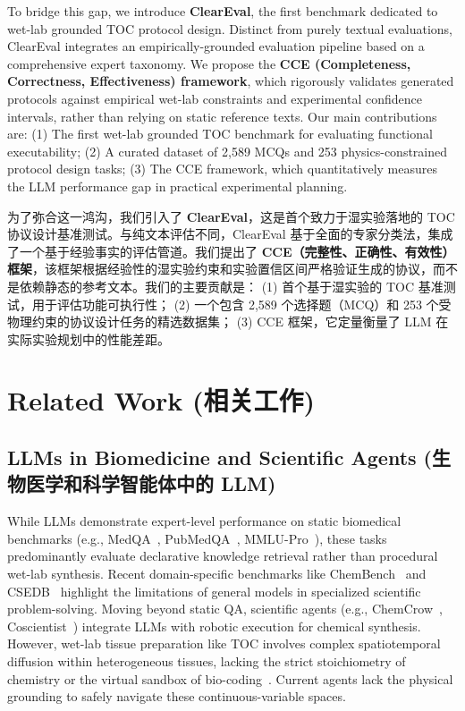\documentclass[runningheads]{llncs}
\begin{document}
To bridge this gap, we introduce \textbf{ClearEval}, the first benchmark dedicated to wet-lab grounded TOC protocol design. Distinct from purely textual evaluations, ClearEval integrates an empirically-grounded evaluation pipeline based on a comprehensive expert taxonomy. We propose the \textbf{CCE (Completeness, Correctness, Effectiveness) framework}, which rigorously validates generated protocols against empirical wet-lab constraints and experimental confidence intervals, rather than relying on static reference texts. Our main contributions are: 
(1) The first wet-lab grounded TOC benchmark for evaluating functional executability; 
(2) A curated dataset of 2,589 MCQs and 253 physics-constrained protocol design tasks; 
(3) The CCE framework, which quantitatively measures the LLM performance gap in practical experimental planning.

为了弥合这一鸿沟，我们引入了 \textbf{ClearEval}，这是首个致力于湿实验落地的 TOC 协议设计基准测试。与纯文本评估不同，ClearEval 基于全面的专家分类法，集成了一个基于经验事实的评估管道。我们提出了 \textbf{CCE（完整性、正确性、有效性）框架}，该框架根据经验性的湿实验约束和实验置信区间严格验证生成的协议，而不是依赖静态的参考文本。我们的主要贡献是：
(1) 首个基于湿实验的 TOC 基准测试，用于评估功能可执行性；
(2) 一个包含 2,589 个选择题（MCQ）和 253 个受物理约束的协议设计任务的精选数据集；
(3) CCE 框架，它定量衡量了 LLM 在实际实验规划中的性能差距。

\section{Related Work (相关工作)}
\subsection{LLMs in Biomedicine and Scientific Agents (生物医学和科学智能体中的 LLM)}

While LLMs demonstrate expert-level performance on static biomedical benchmarks (e.g., MedQA~\cite{jin2021disease}, PubMedQA~\cite{jin2019pubmedqa}, MMLU-Pro~\cite{wang2024mmlupro}), these tasks predominantly evaluate declarative knowledge retrieval rather than procedural wet-lab synthesis. Recent domain-specific benchmarks like ChemBench~\cite{mirza2025chembench} and CSEDB~\cite{wang2025csedb} highlight the limitations of general models in specialized scientific problem-solving. Moving beyond static QA, scientific agents (e.g., ChemCrow~\cite{bran2024chemcrow}, Coscientist~\cite{boiko2024autonomous}) integrate LLMs with robotic execution for chemical synthesis. However, wet-lab tissue preparation like TOC involves complex spatiotemporal diffusion within heterogeneous tissues, lacking the strict stoichiometry of chemistry or the virtual sandbox of bio-coding~\cite{odonoghue2023bioplanner}. Current agents lack the physical grounding to safely navigate these continuous-variable spaces.
\end{document}

